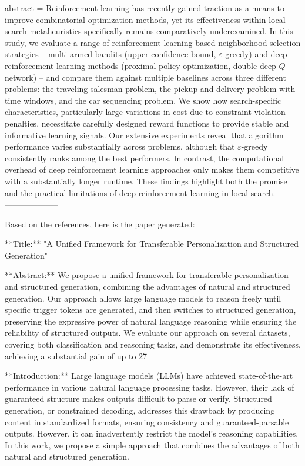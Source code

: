 {      abstract = {Reinforcement learning has recently gained traction as a means to improve combinatorial optimization methods, yet its effectiveness within local search metaheuristics specifically remains comparatively underexamined. In this study, we evaluate a range of reinforcement learning-based neighborhood selection strategies -- multi-armed bandits (upper confidence bound, $ε$-greedy) and deep reinforcement learning methods (proximal policy optimization, double deep $Q$-network) -- and compare them against multiple baselines across three different problems: the traveling salesman problem, the pickup and delivery problem with time windows, and the car sequencing problem. We show how search-specific characteristics, particularly large variations in cost due to constraint violation penalties, necessitate carefully designed reward functions to provide stable and informative learning signals. Our extensive experiments reveal that algorithm performance varies substantially across problems, although that $ε$-greedy consistently ranks among the best performers. In contrast, the computational overhead of deep reinforcement learning approaches only makes them competitive with a substantially longer runtime. These findings highlight both the promise and the practical limitations of deep reinforcement learning in local search.}
}
        --------------------
        


Based on the references, here is the paper generated:

**Title:** "A Unified Framework for Transferable Personalization and Structured Generation"

**Abstract:** We propose a unified framework for transferable personalization and structured generation, combining the advantages of natural and structured generation. Our approach allows large language models to reason freely until specific trigger tokens are generated, and then switches to structured generation, preserving the expressive power of natural language reasoning while ensuring the reliability of structured outputs. We evaluate our approach on several datasets, covering both classification and reasoning tasks, and demonstrate its effectiveness, achieving a substantial gain of up to 27%

**Introduction:**
Large language models (LLMs) have achieved state-of-the-art performance in various natural language processing tasks. However, their lack of guaranteed structure makes outputs difficult to parse or verify. Structured generation, or constrained decoding, addresses this drawback by producing content in standardized formats, ensuring consistency and guaranteed-parsable outputs. However, it can inadvertently restrict the model's reasoning capabilities. In this work, we propose a simple approach that combines the advantages of both natural and structured generation.

